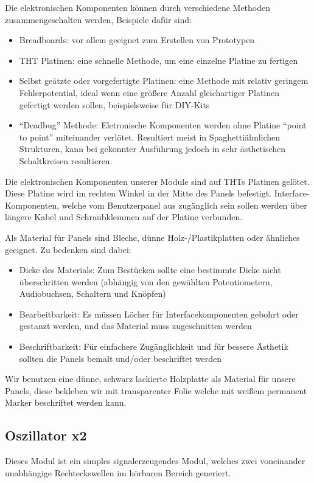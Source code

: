 Die elektronischen Komponenten können durch verschiedene Methoden zusammengeschalten werden, Beispiele dafür sind:
\begin{itemize}
\item Breadboards:
vor allem geeignet zum Erstellen von Prototypen
\item \ac{THT} Platinen:
eine schnelle Methode, um eine einzelne Platine zu fertigen
\item Selbst geätzte oder vorgefertigte Platinen:
eine Methode mit relativ geringem Fehlerpotential, ideal wenn eine größere Anzahl gleichartiger Platinen gefertigt werden sollen, beispielsweise für DIY-Kits
\item "`Deadbug"' Methode:
Eletronische Komponenten werden ohne Platine "`point to point"' miteinander verlötet. Resultiert meist in Spaghettiähnlichen Strukturen, kann bei gekonnter Ausführung jedoch in sehr ästhetischen Schaltkreisen resultieren.
\end{itemize}

Die elektronischen Komponenten unserer Module sind auf \acp{THT} Platinen gelötet. Diese Platine wird im rechten Winkel in der Mitte des Panels befestigt. Interface-Komponenten, welche vom Benutzerpanel aus zugänglich sein sollen werden über längere Kabel und Schraubklemmen auf der Platine verbunden.

Als Material für Panels sind Bleche, dünne Holz-/Plastikplatten oder ähnliches geeignet. Zu bedenken sind dabei:

\begin{itemize}
\item Dicke des Materials:
Zum Bestücken sollte eine bestimmte Dicke nicht überschritten werden (abhängig von den gewählten Potentiometern, Audiobuchsen, Schaltern und Knöpfen)
\item Bearbeitbarkeit:
Es müssen Löcher für Interfacekomponenten gebohrt oder gestanzt werden, und das Material muss zugeschnitten werden
\item Beschriftbarkeit:
Für einfachere Zugänglichkeit und für bessere Ästhetik sollten die Panels bemalt und/oder beschriftet werden
\end{itemize}

Wir benutzen eine dünne, schwarz lackierte Holzplatte als Material für unsere Panels, diese bekleben wir mit transparenter Folie welche mit weißem permanent Marker beschriftet werden kann.

\subsection{Oszillator x2}
\label{sec:orgc4fa578}
Dieses Modul ist ein simples signalerzeugendes Modul, welches zwei voneinander unabhängige Rechteckswellen im hörbaren Bereich generiert.

